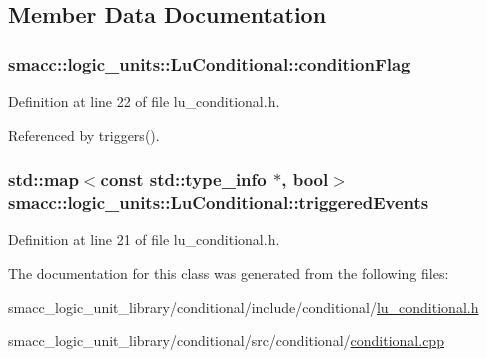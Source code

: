 \subsection{Member Data Documentation}
\subsubsection[{\texorpdfstring{condition\+Flag}{conditionFlag}}]{ smacc\+::logic\+\_\+units\+::\+Lu\+Conditional\+::condition\+Flag\hspace{0.3cm}{\ttfamily [private]}}\hypertarget{classsmacc_1_1logic__units_1_1LuConditional_a3467d1cd6e1801f892dbf8702539a707}{}\label{classsmacc_1_1logic__units_1_1LuConditional_a3467d1cd6e1801f892dbf8702539a707}


Definition at line 22 of file lu\+\_\+conditional.\+h.



Referenced by triggers().

\subsubsection[{\texorpdfstring{triggered\+Events}{triggeredEvents}}]{\setlength{\rightskip}{0pt plus 5cm}std\+::map$<$const std\+::type\+\_\+info $\ast$, {\bf bool}$>$ smacc\+::logic\+\_\+units\+::\+Lu\+Conditional\+::triggered\+Events\hspace{0.3cm}{\ttfamily [private]}}\hypertarget{classsmacc_1_1logic__units_1_1LuConditional_a506a426f93e02267406fa318dd370bf1}{}\label{classsmacc_1_1logic__units_1_1LuConditional_a506a426f93e02267406fa318dd370bf1}


Definition at line 21 of file lu\+\_\+conditional.\+h.



The documentation for this class was generated from the following files\+:\begin{DoxyCompactItemize}
\item 
smacc\+\_\+logic\+\_\+unit\+\_\+library/conditional/include/conditional/\hyperlink{lu__conditional_8h}{lu\+\_\+conditional.\+h}\item 
smacc\+\_\+logic\+\_\+unit\+\_\+library/conditional/src/conditional/\hyperlink{conditional_8cpp}{conditional.\+cpp}\end{DoxyCompactItemize}
